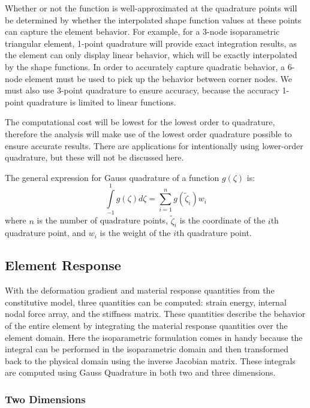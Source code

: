 \documentclass[]{spie}  %
\begin{document}
Whether or not the function is well-approximated at the quadrature points will be determined by whether the interpolated shape function values at these points can capture the element behavior. For example, for a 3-node isoparametric triangular element, 1-point quadrature will provide exact integration results, as the element can only display linear behavior, which will be exactly interpolated by the shape functions. In order to accurately capture quadratic behavior, a 6-node element must be used to pick up the behavior between corner nodes. We must also use 3-point quadrature to ensure accuracy, because the accuracy 1-point quadrature is limited to linear functions.

The computational cost will be lowest for the lowest order to quadrature, therefore the analysis will make use of the lowest order quadrature possible to ensure accurate results. There are applications for intentionally using lower-order quadrature, but these will not be discussed here.

The general expression for Gauss quadrature of a function $g(\zeta)$ is:
\begin{equation}
\label{eq: Gauss quadrature general}
\int\limits_{-1}^{1} g(\zeta)d\zeta = \sum\limits_{i=1}^{n} g(\tilde{\zeta}_i) w_i
\end{equation}
where $n$ is the number of quadrature points, $\tilde{\zeta}_i$ is the coordinate of the $i$th quadrature point, and $w_i$ is the weight of the $i$th quadrature point. 

\subsection{Element Response}
\label{sec: element response}
With the deformation gradient and material response quantities from the constitutive model, three quantities can be computed: strain energy, internal nodal force array, and the stiffness matrix. These quantities describe the behavior of the entire element by integrating the material response quantities over the element domain. Here the isoparametric formulation comes in handy because the integral can be performed in the isoparametric domain and then transformed back to the physical domain using the inverse Jacobian matrix. These integrals are computed using Gauss Quadrature in both two and three dimensions.

\subsubsection{Two Dimensions}
\end{document}
